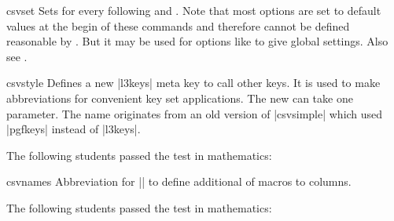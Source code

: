 \documentclass[a4paper,11pt]{ltxdoc}
\begin{document}
\clearpage

\begin{docCommand}[doc updated = 2021-06-25]{csvset}{}
  Sets  for every following
   and .
  Note that most options are set to default values at the begin of these
  commands and therefore cannot be defined reasonable by .
  But it may be used for options like 
  to give global settings. Also see .
\end{docCommand}


\begin{docCommand}{csvstyle}{}
  Defines a new |l3keys| meta key to call other keys. It is used to
  make abbreviations for convenient key set applications.
  The new  can take one parameter. The name 
  originates from an old version of |csvsimple| which used |pgfkeys|
  instead of |l3keys|.

\begin{dispExample}
The following students passed the test in mathematics:\\
\end{dispExample}
\end{docCommand}


\begin{docCommand}{csvnames}{}
  Abbreviation for ||
  to define additional  of macros to columns.
\begin{dispExample}
The following students passed the test in mathematics:\\
\end{dispExample}
\end{docCommand}


\end{document}
